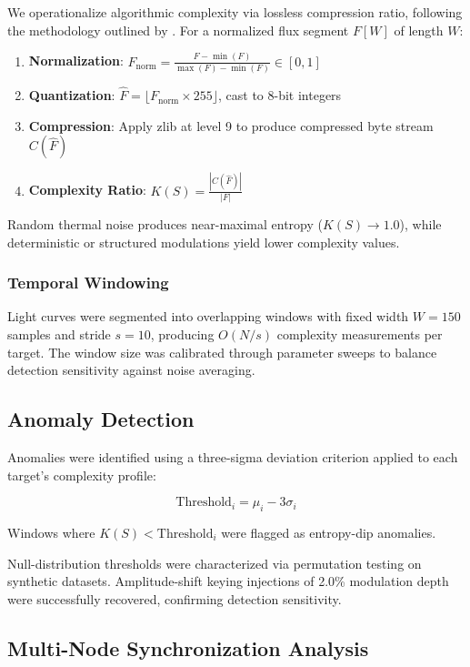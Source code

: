 \documentclass[twocolumn,10pt]{article}
\begin{document}
We operationalize algorithmic complexity via lossless compression ratio, following the methodology outlined by \citet{li1997}. For a normalized flux segment $F[W]$ of length $W$:

\begin{enumerate}
    \item \textbf{Normalization}: $F_{\text{norm}} = \frac{F - \min(F)}{\max(F) - \min(F)} \in [0,1]$
    \item \textbf{Quantization}: $\hat{F} = \lfloor F_{\text{norm}} \times 255 \rfloor$, cast to 8-bit integers
    \item \textbf{Compression}: Apply zlib at level 9 to produce compressed byte stream $C(\hat{F})$
    \item \textbf{Complexity Ratio}: $K(S) = \frac{|C(\hat{F})|}{|F|}$
\end{enumerate}

Random thermal noise produces near-maximal entropy ($K(S) \to 1.0$), while deterministic or structured modulations yield lower complexity values.

\subsubsection{Temporal Windowing}

Light curves were segmented into overlapping windows with fixed width $W=150$ samples and stride $s=10$, producing $O(N/s)$ complexity measurements per target. The window size was calibrated through parameter sweeps to balance detection sensitivity against noise averaging.

\subsection{Anomaly Detection}

Anomalies were identified using a three-sigma deviation criterion applied to each target's complexity profile:

$$\text{Threshold}_i = \mu_i - 3\sigma_i$$

Windows where $K(S) < \text{Threshold}_i$ were flagged as entropy-dip anomalies.

Null-distribution thresholds were characterized via permutation testing on synthetic datasets. Amplitude-shift keying injections of 2.0\% modulation depth were successfully recovered, confirming detection sensitivity.

\subsection{Multi-Node Synchronization Analysis}
\end{document}
